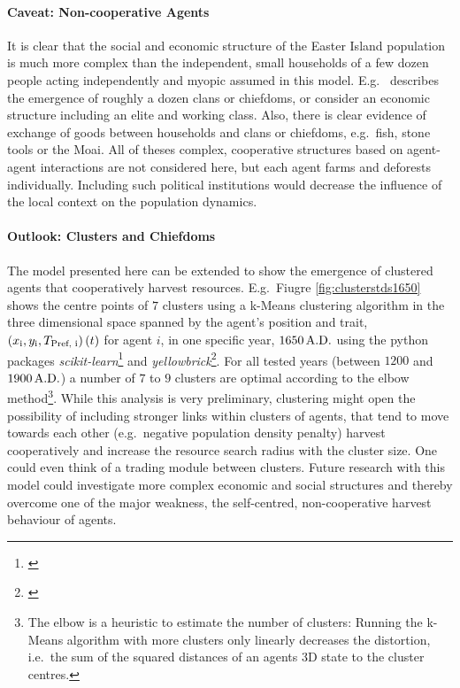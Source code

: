 \paragraph{Caveat: Non-cooperative Agents}
It is clear that the social and economic structure of the Easter Island population is much more complex than the independent, small households of a few dozen people acting independently and myopic assumed in this model. 
E.g.\ \citet{Diamond2011} describes the emergence of roughly a dozen clans or chiefdoms, or \citet{Puleston2017} consider an economic structure including an elite and working class.
Also, there is clear evidence of exchange of goods between households and clans or chiefdoms, e.g.\ fish, stone tools or the Moai.
All of theses complex, cooperative structures based on agent-agent interactions are not considered here, but each agent farms and deforests individually.
Including such political institutions would decrease the influence of the local context on the population dynamics.

\paragraph{Outlook: Clusters and Chiefdoms}
The model presented here can be extended to show the emergence of clustered agents that cooperatively harvest resources.
E.g.\ Fiugre \ref{fig:clusterstds1650} shows the centre points of $7$ clusters using a k-Means clustering algorithm in the three dimensional space spanned by the agent's position and trait, $\left( x_{\rm i}, y_{\rm i}, T_\text{Pref, i} \right)(t)$ for agent $i$, in one specific year, $1650\, {\rm A.D.}$ using the python packages \textit{scikit-learn}\footnote{\citet{scikit-learn}} and \textit{yellowbrick}\footnote{\citet{yellowbrick}}.
For all tested years (between $1200$ and $1900\, {\rm A.D.}$) a number of $7$ to $9$ clusters are optimal according to the elbow method\footnote{The elbow is a heuristic to estimate the number of clusters:
	Running the k-Means algorithm with more clusters only linearly decreases the distortion, i.e.\ the sum of the squared distances of an agents 3D state to the cluster centres.}.
While this analysis is very preliminary, clustering might open the possibility of including stronger links within clusters of agents, that tend to move towards each other (e.g.\ negative population density penalty) harvest cooperatively and increase the resource search radius with the cluster size.
One could even think of a trading module between clusters.
Future research with this model could investigate more complex economic and social structures and thereby overcome one of the major weakness, the self-centred, non-cooperative harvest behaviour of agents.

